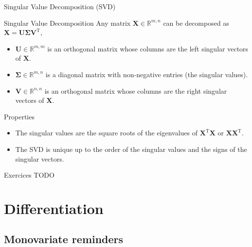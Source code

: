 \documentclass[aspectratio=1610]{beamer}
\begin{document}
\begin{frame}{Singular Value Decomposition (SVD)}

  \begin{block}{Singular Value Decomposition}
    Any matrix $\mathbf{X}\in\mathbb{R}^{m,n}$ can be decomposed as $\mathbf{X} = \mathbf{U}\boldsymbol{\Sigma}\mathbf{V}^\mathrm{T},$
    \begin{itemize}
      \item $\mathbf{U}\in\mathbb{R}^{m,m}$ is an orthogonal matrix whose columns are the left singular vectors of $\mathbf{X}$.
      \item $\boldsymbol{\Sigma}\in\mathbb{R}^{m,n}$ is a diagonal matrix with non-negative entries (the singular values).
      \item $\mathbf{V}\in\mathbb{R}^{n,n}$ is an orthogonal matrix whose columns are the right singular vectors of $\mathbf{X}$.
    \end{itemize}
  \end{block}

  \begin{block}{Properties}
    \footnotesize
    \begin{itemize}
      \item The singular values are the square roots of the eigenvalues of $\mathbf{X}^\mathrm{T}\mathbf{X}$ or $\mathbf{X}\mathbf{X}^\mathrm{T}$.
      \item The SVD is unique up to the order of the singular values and the signs of the singular vectors.
    \end{itemize}
  \end{block}
  
\end{frame}



\begin{frame}{Exercices}
  TODO
\end{frame}


\section{Differentiation}

\subsection{Monovariate reminders}
\end{document}
